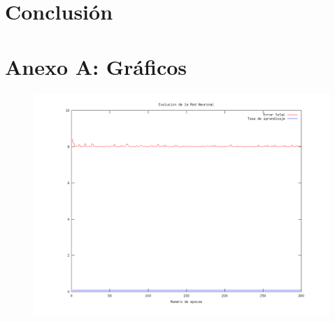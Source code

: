 \documentclass[%
    final,
    reprint,
    notitlepage,
    narroweqnarray,
    inline,
    twoside,
    invited
    ]{ieee}
\begin{document}
\section{Conclusión}













\clearpage
\onecolumn

\section*{Anexo A: Gráficos}

\begin{figure}[H]
\begin{center}
\includegraphics[scale=0.30]{./images/LinearConstante.png}
\label{modelado}
\end{center}
\end{figure}
\end{document}
